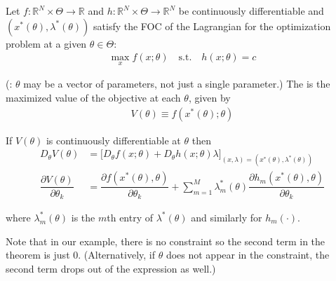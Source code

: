 \documentclass{article}
\begin{document}
\begin{theorem}
  Let $f: \mathbb{R}^N \times \Theta \to \mathbb{R}$ and $h: \mathbb{R}^N \times \Theta \to \mathbb{R}^N$ be continuously differentiable and $(x^*(\theta), \lambda^*(\theta))$ satisfy the FOC of the Lagrangian for the optimization problem at a given $\theta \in \Theta$:
  \begin{align*}
    \max_x f(x; \theta) \quad\text{s.t.}\quad h(x; \theta) = c
  \end{align*}

  (\NB: $\theta$ may be a vector of parameters, not just a single parameter.) The  is the maximized value of the objective at each $\theta$, given by
  \begin{align*}
    V(\theta) \equiv f(x^*(\theta); \theta)
  \end{align*}

  If $V(\theta)$ is continuously differentiable at $\theta$ then
  \begin{align*}
    D_{\theta} V(\theta)
    &
    =
    \Big[
      D_{\theta} f(x; \theta)
      +
      D_{\theta} h(x; \theta) \lambda
    \Big]_{(x, \lambda) = (x^*(\theta), \lambda^*(\theta))}
    \\
    \dfrac{\partial V(\theta)}{\partial \theta_k}
    &
    =
    \dfrac{\partial f(x^*(\theta), \theta)}{\partial \theta_k}
    +
    \sum^{M}_{m = 1}
    \lambda_m^*(\theta)
    \dfrac{\partial h_m(x^*(\theta), \theta)}{\partial \theta_k}
  \end{align*}

  where $\lambda_m^*(\theta)$ is the $m$th entry of $\lambda^*(\theta)$ and similarly for $h_m(\cdot)$.
\end{theorem}

Note that in our example, there is no constraint so the second term in the theorem is just $0$. (Alternatively, if $\theta$ does not appear in the constraint, the second term drops out of the expression as well.)
\end{document}
